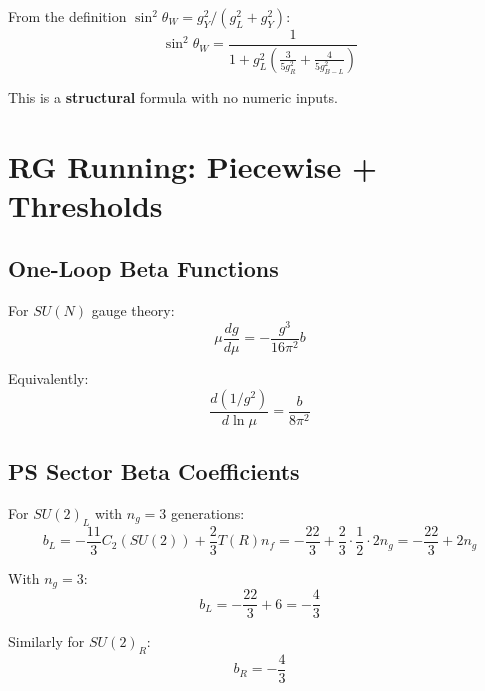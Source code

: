\documentclass[11pt,a4paper]{article}
\begin{document}
From the definition $\sin^2\theta_W = g_Y^2/(g_L^2 + g_Y^2)$:
\begin{equation}
\label{eq:weinberg-structural}
\boxed{\sin^2\theta_W = \frac{1}{1 + g_L^2 \left(\frac{3}{5 g_R^2} + \frac{4}{5 g_{B-L}^2}\right)}}
\end{equation}

This is a \textbf{structural} formula with no numeric inputs.

\section{RG Running: Piecewise + Thresholds}
\label{sec:rg-running}

\subsection{One-Loop Beta Functions}
\label{subsec:beta-functions}

For $SU(N)$ gauge theory:
\begin{equation}
\label{eq:beta-general}
\mu \frac{dg}{d\mu} = -\frac{g^3}{16\pi^2} b
\end{equation}

Equivalently:
\begin{equation}
\label{eq:rg-inverse}
\frac{d(1/g^2)}{d\ln\mu} = \frac{b}{8\pi^2}
\end{equation}

\subsection{PS Sector Beta Coefficients}
\label{subsec:ps-beta}

For $SU(2)_L$ with $n_g = 3$ generations:
\begin{equation}
\label{eq:b-L}
b_L = -\frac{11}{3} C_2(SU(2)) + \frac{2}{3} T(R) n_f = -\frac{22}{3} + \frac{2}{3} \cdot \frac{1}{2} \cdot 2 n_g = -\frac{22}{3} + 2 n_g
\end{equation}

With $n_g = 3$:
\begin{equation}
\label{eq:b-L-value}
b_L = -\frac{22}{3} + 6 = -\frac{4}{3}
\end{equation}

Similarly for $SU(2)_R$:
\begin{equation}
\label{eq:b-R-value}
b_R = -\frac{4}{3}
\end{equation}
\end{document}
